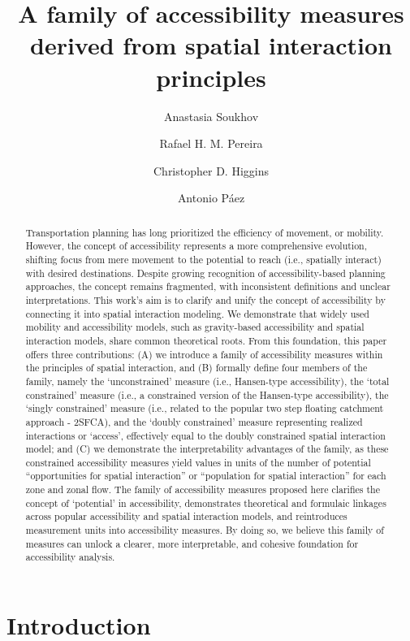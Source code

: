 \documentclass[
]{article}
\title{A family of accessibility measures derived from spatial
interaction principles}
\author{Anastasia Soukhov \and Rafael H. M. Pereira \and Christopher D.
Higgins \and Antonio Páez}
\date{}
\begin{document}
\maketitle
\begin{abstract}
Transportation planning has long prioritized the efficiency of movement,
or mobility. However, the concept of accessibility represents a more
comprehensive evolution, shifting focus from mere movement to the
potential to reach (i.e., spatially interact) with desired destinations.
Despite growing recognition of accessibility-based planning approaches,
the concept remains fragmented, with inconsistent definitions and
unclear interpretations. This work's aim is to clarify and unify the
concept of accessibility by connecting it into spatial interaction
modeling. We demonstrate that widely used mobility and accessibility
models, such as gravity-based accessibility and spatial interaction
models, share common theoretical roots. From this foundation, this paper
offers three contributions: (A) we introduce a family of accessibility
measures within the principles of spatial interaction, and (B) formally
define four members of the family, namely the `unconstrained' measure
(i.e., Hansen-type accessibility), the `total constrained' measure
(i.e., a constrained version of the Hansen-type accessibility), the
`singly constrained' measure (i.e., related to the popular two step
floating catchment approach - 2SFCA), and the `doubly constrained'
measure representing realized interactions or `access', effectively
equal to the doubly constrained spatial interaction model; and (C) we
demonstrate the interpretability advantages of the family, as these
constrained accessibility measures yield values in units of the number
of potential ``opportunities for spatial interaction'' or ``population
for spatial interaction'' for each zone and zonal flow. The family of
accessibility measures proposed here clarifies the concept of
`potential' in accessibility, demonstrates theoretical and formulaic
linkages across popular accessibility and spatial interaction models,
and reintroduces measurement units into accessibility measures. By doing
so, we believe this family of measures can unlock a clearer, more
interpretable, and cohesive foundation for accessibility analysis.
\end{abstract}

\section{Introduction}\label{introduction}
\end{document}
